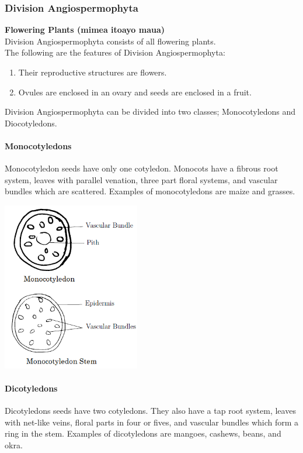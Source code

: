 \begin{multicols}{2}
\subsubsection{Division Angiospermophyta}
\textbf{Flowering Plants (mimea itoayo maua)}\\ 
Division Angiospermophyta consists of all flowering plants. \\
The following are the features of Division Angiospermophyta:
\begin{enumerate}
\item{Their reproductive structures are flowers.} 
\item{Ovules are enclosed in an ovary and seeds are enclosed in a fruit.}
\end{enumerate}

Division Angiospermophyta can be divided into two classes; Monocotyledons and Diocotyledons.

\setcounter{secnumdepth}{4}

\paragraph{\textbf{Monocotyledons}}
Monocotyledon seeds have only one cotyledon. Monocots have a fibrous root system, leaves with parallel venation, three part floral systems, and vascular bundles which are scattered. Examples of monocotyledons are maize and grasses.

\begin{center}
\includegraphics[width=0.45\textwidth]{./img/monocotyledon.png}
\end{center}

\columnbreak

\paragraph{\textbf{Dicotyledons}}
Dicotyledons seeds have two cotyledons. They also have a tap root system, leaves with net-like veins, floral parts in four or fives, and vascular bundles which form a ring in the stem. Examples of dicotyledons are mangoes, cashews, beans, and okra.


\end{multicols}
